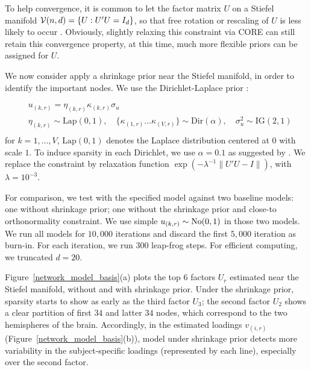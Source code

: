 \documentclass[10pt,fleqn]{article} \pdfoutput=1
\DeclareMathOperator{\1}{\mathbbm{1}} \DeclareMathOperator{\bigO}{\mc O}
\begin{document}
To help convergence, it is common to let the factor matrix $U$ on a Stiefel manifold $\mathcal{V}(n,d)=\{U: U'U=I_d\}$, so that free rotation or rescaling of $U$ is less likely to  occur \citep{hoff2016equivariant}. Obviously, slightly relaxing this constraint via CORE can still retain this convergence property, at this time, much more flexible priors can be assigned for $U$.



We now consider apply a shrinkage prior near the Stiefel manifold, in order to  identify the important nodes. We use the Dirichlet-Laplace prior \citep{bhattacharya2015dirichlet}:

\begin{equation*} \begin{aligned}
& u_{(k,r)}= \eta_{(k,r)}\kappa_{(k,r)}\sigma_{u} \\
&
\eta_{(k,r)}\sim \text{Lap}(0,1), \quad \{\kappa_{(1,r)}\ldots
\kappa_{(V,r)}\} \sim \text{Dir}(\alpha), \quad \sigma^2_{u}\sim
\text{IG}(2,1)                                     \\\end{aligned} \end{equation*}
for $k=1,\ldots, V$,  $\text{Lap}(0,1)$ denotes the
Laplace distribution centered at $0$ with scale $1$. To induce sparsity in each Dirichlet, we use $\alpha=0.1$ as
suggested by \cite{bhattacharya2015dirichlet}. We replace the constraint by relaxation function $\exp( - \lambda^{-1} \|U'U-I\|)$, with $\lambda=10^{-3}$.

For comparison, we test with the specified model against two baseline
models:
one without
shrinkage prior; one without the shrinkage prior and
close-to orthonormality constraint. We use simple $u_{(k,r)}\sim\operatorname{No}(0,1)$ in those two models. We run all
models for $10,000$ iterations and discard the first $5,000$ iteration as
burn-in.  For each iteration, we run $300$ leap-frog steps. For efficient
computing, we truncated $d=20$.

Figure~\ref{network_model_basis}(a) plots the top $6$ factors $U_r$ estimated near the Stiefel manifold, without and with shrinkage prior. Under the shrinkage prior, sparsity starts to show as early as the third factor $U_3$; the second factor $U_2$ shows a clear partition of first $34$ and latter $34$ nodes, which correspond to the two hemispheres of the brain. Accordingly, in the estimated loadings $v_{(i,r) }$ (Figure~\ref{network_model_basis}(b)), model under shrinkage prior detects more variability in the subject-specific loadings (represented by each line), especially over the second factor.
\end{document}
